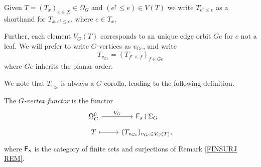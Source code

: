 \documentclass[a4paper,10pt]{article}%
\begin{document}
\begin{notation}\label{GVERT NOT}
Given $T=(T_x)_{x \in X} \in \Omega_G$
and $(e^{\uparrow} \leq e) \in V(T)$ 
we write $T_{e^{\uparrow}\leq e}$
as a shorthand for $T_{x,e^{\uparrow}\leq e}$, where $e \in T_x$.

Further, each element $V_G(T)$ corresponds to an unique edge orbit $Ge$ for $e$ not a leaf.
We will prefer to write $G$-vertices as $v_{Ge}$, and write
\begin{equation}\label{TVGE DEF}
T_{v_{Ge}} = (T_{f^{\uparrow} \leq f})_{f \in Ge}
\end{equation}
where $Ge$ inherits the planar order.
\end{notation}


We note that $T_{v_{Ge}}$ is always a $G$-corolla, leading to the following definition.

\begin{definition}
The \textit{$G$-vertex functor} is the functor
	\begin{equation}\label{VFUNCTOR EQ}
		\begin{tikzcd}[row sep=tiny]
		\Omega_{G}^0 \ar{r}{V_G} & \Fin_s \wr \Sigma_G \\
		T \ar[mapsto]{r} & (T_{v_{Ge}})_{v_{Ge} \in V_G(T)},
		\end{tikzcd}	
	\end{equation}
where $\mathsf{F}_s$ is the category of finite sets and surjections of
Remark \ref{FINSURJ REM}.
\end{definition}
\end{document}
